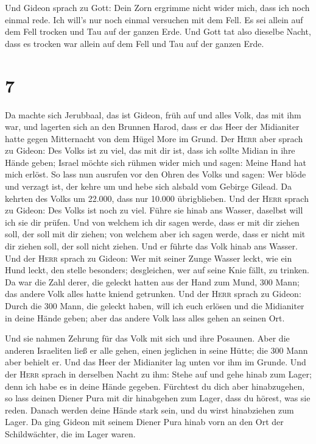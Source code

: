  Und Gideon sprach zu Gott: Dein Zorn ergrimme nicht
wider mich, dass ich noch einmal rede. Ich will's nur noch einmal
versuchen mit dem Fell. Es sei allein auf dem Fell trocken und Tau auf
der ganzen Erde.  Und Gott tat also dieselbe Nacht, dass
es trocken war allein auf dem Fell und Tau auf der ganzen Erde.

\hypertarget{section-6}{%
\section{7}\label{section-6}}

 Da machte sich Jerubbaal, das ist Gideon, früh auf und
alles Volk, das mit ihm war, und lagerten sich an den Brunnen Harod,
dass er das Heer der Midianiter hatte gegen Mitternacht von dem Hügel
More im Grund.  Der \textsc{Herr} aber sprach zu Gideon:
Des Volks ist zu viel, das mit dir ist, dass ich sollte Midian in ihre
Hände geben; Israel möchte sich rühmen wider mich und sagen: Meine Hand
hat mich erlöst.  So lass nun ausrufen vor den Ohren des
Volks und sagen: Wer blöde und verzagt ist, der kehre um und hebe sich
alsbald vom Gebirge Gilead. Da kehrten des Volks um 22.000, dass nur
10.000 übrigblieben.  Und der \textsc{Herr} sprach zu
Gideon: Des Volks ist noch zu viel. Führe sie hinab ans Wasser, daselbst
will ich sie dir prüfen. Und von welchem ich dir sagen werde, dass er
mit dir ziehen soll, der soll mit dir ziehen; von welchem aber ich sagen
werde, dass er nicht mit dir ziehen soll, der soll nicht ziehen.
 Und er führte das Volk hinab ans Wasser. Und der
\textsc{Herr} sprach zu Gideon: Wer mit seiner Zunge Wasser leckt, wie
ein Hund leckt, den stelle besonders; desgleichen, wer auf seine Knie
fällt, zu trinken.  Da war die Zahl derer, die geleckt
hatten aus der Hand zum Mund, 300 Mann; das andere Volk alles hatte
kniend getrunken.  Und der \textsc{Herr} sprach zu Gideon:
Durch die 300 Mann, die geleckt haben, will ich euch erlösen und die
Midianiter in deine Hände geben; aber das andere Volk lass alles gehen
an seinen Ort.

 Und sie nahmen Zehrung für das Volk mit sich und ihre
Posaunen. Aber die anderen Israeliten ließ er alle gehen, einen
jeglichen in seine Hütte; die 300 Mann aber behielt er. Und das Heer der
Midianiter lag unten vor ihm im Grunde.  Und der
\textsc{Herr} sprach in derselben Nacht zu ihm: Stehe auf und gehe hinab
zum Lager; denn ich habe es in deine Hände gegeben. 
Fürchtest du dich aber hinabzugehen, so lass deinen Diener Pura mit dir
hinabgehen zum Lager,  dass du hörest, was sie reden.
Danach werden deine Hände stark sein, und du wirst hinabziehen zum
Lager. Da ging Gideon mit seinem Diener Pura hinab vorn an den Ort der
Schildwächter, die im Lager waren.

